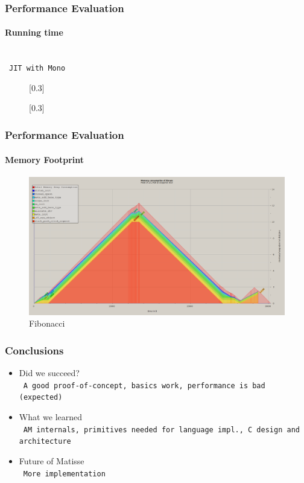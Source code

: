 \documentclass{beamer}
\newcommand{\n}[1]{\leavevmode\\~\texttt{\color{red}\tiny #1}}
\begin{document}
\begin{frame}
  \frametitle{Performance Evaluation}
  \framesubtitle{Running time}

  \n{JIT with Mono}

  \begin{figure}
    \centering
    \begin{minipage}{.5\textwidth}
      \centering
          \scalebox{0.36}[0.3]{}
    \end{minipage}%
    \begin{minipage}{.5\textwidth}
      \centering
          \scalebox{0.36}[0.3]{}
    \end{minipage}
  \end{figure}
\end{frame}

\begin{frame}
  \frametitle{Performance Evaluation}
  \framesubtitle{Memory Footprint}

  \begin{figure}[H]
    \centering
    \includegraphics[scale=0.23]{../figures/fig-mem}
    \caption{Fibonacci}
  \end{figure}
\end{frame}

\begin{frame}
  \frametitle{Conclusions}

  \begin{itemize}
  \item Did we succeed?
    \n{A good proof-of-concept, basics work, performance is bad (expected)}
  \item What we learned
    \n{AM internals, primitives needed for language impl., C design and architecture}
  \item Future of Matisse
    \n{More implementation}
  \end{itemize}
\end{frame}
\end{document}
